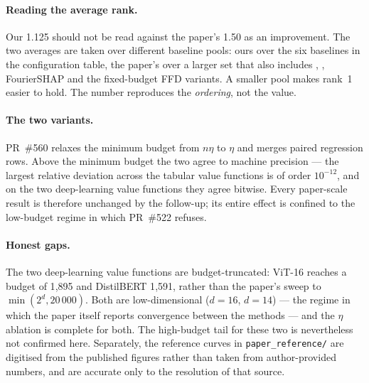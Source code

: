 \paragraph{Reading the average rank.}
Our 1.125 should not be read against the paper's 1.50 as an improvement. The two averages are
taken over different baseline pools: ours over the six baselines in the configuration table,
the paper's over a larger set that also includes \leverageshap{}, \polyshap{}, FourierSHAP and
the fixed-budget FFD variants. A smaller pool makes rank~1 easier to hold. The number
reproduces the \emph{ordering}, not the value.

\paragraph{The two variants.}
PR~\#560 relaxes the minimum budget from $n\eta$ to $\eta$ and merges paired regression rows.
Above the minimum budget the two agree to machine precision --- the largest relative deviation
across the tabular value functions is of order $10^{-12}$, and on the two deep-learning value
functions they agree bitwise. Every paper-scale result is therefore unchanged by the follow-up;
its entire effect is confined to the low-budget regime in which PR~\#522 refuses.

\paragraph{Honest gaps.}
The two deep-learning value functions are budget-truncated: ViT-16 reaches a budget of 1{,}895
and DistilBERT 1{,}591, rather than the paper's sweep to $\min(2^d, 20\,000)$. Both are
low-dimensional ($d = 16$, $d = 14$) --- the regime in which the paper itself reports
convergence between the methods --- and the $\eta$ ablation is complete for both. The
high-budget tail for these two is nevertheless not confirmed here. Separately, the reference
curves in
\texttt{paper\_reference/} are digitised from the published figures rather than taken from
author-provided numbers, and are accurate only to the resolution of that source.
